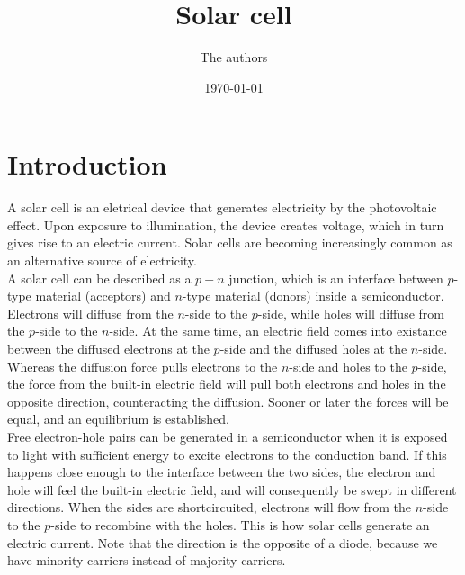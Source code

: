 \documentclass[a4paper]{article}
\title{Solar cell}
\author{The authors}
\date{\today}
\begin{document}
\maketitle

\section{Introduction}

A solar cell is an eletrical device that generates electricity by the photovoltaic effect. Upon exposure to illumination, the device creates voltage, which in turn gives rise to an electric current. Solar cells are becoming increasingly common as an alternative source of electricity. \\

A solar cell can be described as a $p-n$ junction, which is an interface between $p$-type material (acceptors) and $n$-type material (donors) inside a semiconductor. Electrons will diffuse from the $n$-side to the $p$-side, while holes will diffuse from the $p$-side to the $n$-side. At the same time, an electric field comes into existance between the diffused electrons at the $p$-side and the diffused holes at the $n$-side. Whereas the diffusion force pulls electrons to the $n$-side and holes to the $p$-side, the force from the built-in electric field will pull both electrons and holes in the opposite direction, counteracting the diffusion. Sooner or later the forces will be equal, and an equilibrium is established. \\


Free electron-hole pairs can be generated in a semiconductor when it is exposed to light with sufficient energy to excite electrons to the conduction band. If this happens close enough to the interface between the two sides, the electron and hole will feel the built-in electric field, and will consequently be swept in different directions. When the sides are shortcircuited, electrons will flow from the $n$-side to the $p$-side to recombine with the holes. This is how solar cells generate an electric current. Note that the direction is the opposite of a diode, because we have minority carriers instead of majority carriers.
\end{document}
